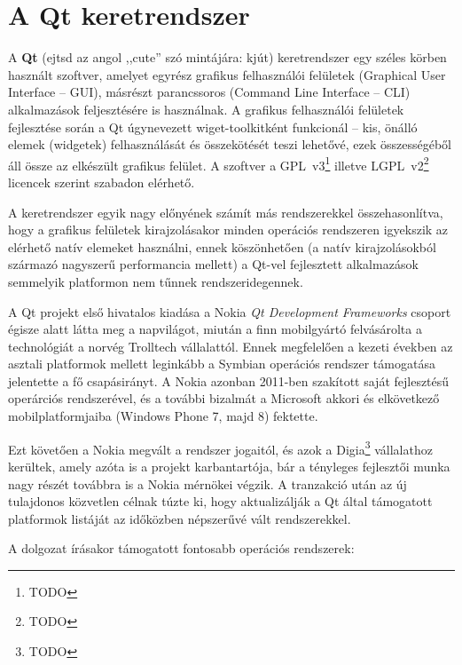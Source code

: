 \section{A Qt keretrendszer}\label{sect:qt}

A \textbf{Qt} (ejtsd az angol ,,cute'' szó mintájára: kjút) keretrendszer egy széles körben használt szoftver, amelyet egyrész grafikus felhasználói felületek (Graphical User Interface -- GUI), másrészt parancssoros (Command Line Interface -- CLI) alkalmazások feljesztésére is használnak. A grafikus felhasználói felületek fejlesztése során a Qt úgynevezett wiget-toolkitként funkcionál -- kis, önálló elemek (widgetek) felhasználását és összekötését teszi lehetővé, ezek összességéből áll össze az elkészült grafikus felület. A szoftver a  GPL~v3\footnote{TODO} illetve LGPL~v2\footnote{TODO} licencek szerint szabadon elérhető.

A keretrendszer egyik nagy előnyének számít más rendszerekkel összehasonlítva, hogy a grafikus felületek kirajzolásakor minden operációs rendszeren igyekszik az elérhető natív elemeket használni, ennek köszönhetően (a natív kirajzolásokból származó nagyszerű performancia mellett) a Qt-vel fejlesztett alkalmazások semmelyik platformon nem tűnnek rendszeridegennek.

\bigskip

A Qt projekt első hivatalos kiadása a Nokia \emph{Qt Development Frameworks} csoport égisze alatt látta meg a napvilágot, miután a finn mobilgyártó felvásárolta a technológiát a norvég Trolltech vállalattól. Ennek megfelelően a kezeti években az asztali platformok mellett leginkább a Symbian operációs rendszer támogatása jelentette a fő csapásirányt. A Nokia azonban 2011-ben szakított saját fejlesztésű operárciós rendszerével, és a további bizalmát a Microsoft akkori és elkövetkező mobilplatformjaiba (Windows Phone 7, majd 8) fektette.

Ezt követően a Nokia megvált a rendszer jogaitól, és azok a Digia\footnote{TODO} vállalathoz kerültek, amely azóta is a projekt karbantartója, bár a tényleges fejlesztői munka nagy részét továbbra is a Nokia mérnökei végzik. A tranzakció után az új tulajdonos közvetlen célnak túzte ki, hogy aktualizálják a Qt által támogatott platformok listáját az időközben népszerűvé vált rendszerekkel.

A dolgozat írásakor támogatott fontosabb operációs rendszerek:

